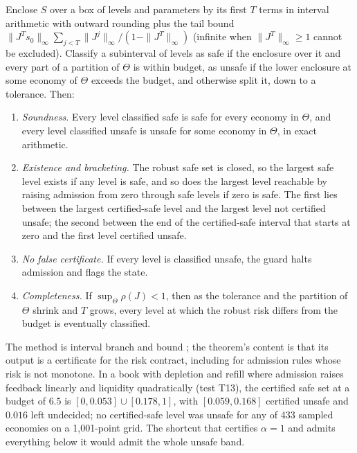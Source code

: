 \begin{theorem}\label{thm:venuebb}
Enclose $S$ over a box of levels and parameters by its first $T$ terms in interval arithmetic with outward rounding plus the tail bound $\|J^Ts_0\|_\infty\sum_{j<T}\|J^j\|_\infty/(1-\|J^T\|_\infty)$ (infinite when $\|J^T\|_\infty\ge1$ cannot be excluded). Classify a subinterval of levels as safe if the enclosure over it and every part of a partition of $\Theta$ is within budget, as unsafe if the lower enclosure at some economy of $\Theta$ exceeds the budget, and otherwise split it, down to a tolerance. Then:
\begin{enumerate}[label=(\roman*)]
\item \emph{Soundness.} Every level classified safe is safe for every economy in $\Theta$, and every level classified unsafe is unsafe for some economy in $\Theta$, in exact arithmetic.
\item \emph{Existence and bracketing.} The robust safe set is closed, so the largest safe level exists if any level is safe, and so does the largest level reachable by raising admission from zero through safe levels if zero is safe. The first lies between the largest certified-safe level and the largest level not certified unsafe; the second between the end of the certified-safe interval that starts at zero and the first level certified unsafe.
\item \emph{No false certificate.} If every level is classified unsafe, the guard halts admission and flags the state.
\item \emph{Completeness.} If $\sup_\Theta\rho(J)<1$, then as the tolerance and the partition of $\Theta$ shrink and $T$ grows, every level at which the robust risk differs from the budget is eventually classified.
\end{enumerate}
\end{theorem}

The method is interval branch and bound \citep{hansen2004}; the theorem's content is that its output is a certificate for the risk contract, including for admission rules whose risk is not monotone. In a book with depletion and refill where admission raises feedback linearly and liquidity quadratically (test T13), the certified safe set at a budget of $6.5$ is $[0,0.053]\cup[0.178,1]$, with $[0.059,0.168]$ certified unsafe and $0.016$ left undecided; no certified-safe level was unsafe for any of 433 sampled economies on a 1{,}001-point grid. The shortcut that certifies $\alpha=1$ and admits everything below it would admit the whole unsafe band.

